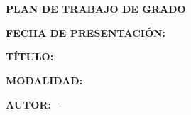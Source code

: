 

\begin{titlepage}
        
    \begin{center}

        \textbf{\MakeUppercase{\Uni}} \\
        \textbf{\MakeUppercase{\Fac}} \\
        \textbf{\MakeUppercase{\Esc}}
        
        \skipline
        
        \textbf{PLAN DE TRABAJO DE GRADO}
        
        \skipline
        \skipline
        
    \end{center}
    
    
    \textbf{FECHA DE PRESENTACIÓN: } \CiudadFecha

    \textbf{TÍTULO: } \Tit
    
    \textbf{MODALIDAD: } \Mod

    \textbf{AUTOR: } \Nam\ - \Cod

\end{titlepage}